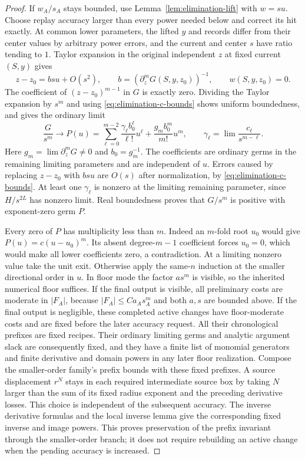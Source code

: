 \begin{proof}
If $w_A/s_A$ stays bounded, use Lemma~\ref{lem:elimination-lift}
with $w=su$.  Choose replay accuracy larger than every power needed
below and correct its hit exactly.  At common lower parameters, the
lifted $y$ and records differ from their center values by arbitrary
power errors, and the current and center $s$ have ratio tending to
$1$.  Taylor expansion in the original independent $z$ at fixed
current $(S,y)$ gives
\[
 z-z_0=b su+O(s^2),\qquad
 b=(\partial_z^mG(S,y,z_0))^{-1},\qquad w(S,y,z_0)=0.
\]
The coefficient of $(z-z_0)^{m-1}$ in $G$ is exactly zero.  Dividing
the Taylor expansion by $s^m$ and using
\eqref{eq:elimination-c-bounds} shows uniform boundedness, and gives
the ordinary limit
\begin{equation}\label{eq:elimination-polynomial}
 \frac{G}{s^m}\longrightarrow
 P(u)=\sum_{\ell=0}^{m-2}\frac{\gamma_\ell b_0^\ell}{\ell!}u^\ell
       +\frac{g_m b_0^m}{m!}u^m,
 \qquad
 \gamma_\ell=\lim\frac{c_\ell}{s^{m-\ell}}.
\end{equation}
Here $g_m=\lim\partial_z^mG\ne0$ and $b_0=g_m^{-1}$.
The coefficients are ordinary germs in the remaining limiting
parameters and are independent of $u$.  Errors caused by replacing
$z-z_0$ with $bsu$ are $O(s)$ after normalization, by
\eqref{eq:elimination-c-bounds}.  At least one $\gamma_\ell$ is
nonzero at the limiting remaining parameter, since $H/s^{2L}$ has
nonzero limit.  Real boundedness proves
that $G/s^m$ is positive with exponent-zero germ $P$.

Every zero of $P$ has multiplicity less than $m$.  Indeed an $m$-fold
root $u_0$ would give $P(u)=c(u-u_0)^m$.  Its absent degree-$m-1$
coefficient forces $u_0=0$, which would make all lower coefficients
zero, a contradiction.  At a limiting nonzero value take the unit
exit.  Otherwise apply the same-$n$ induction at the smaller
directional order in $u$.  In floor mode the factor $as^m$ is visible,
so the inherited numerical floor suffices.  If the final output is
visible, all preliminary costs are moderate in $|F_A|$, because
$|F_A|\le C a_As_A^m$ and both $a,s$ are bounded above.  If the
final output is negligible, these completed active changes have
floor-moderate costs and are fixed before the later accuracy request.
All their chronological prefixes are fixed recipes.  Their ordinary
limiting germs and analytic argument slack are consequently fixed,
and they have a finite list of monomial generators and finite
derivative and domain powers in any later floor realization.
Compose the smaller-order family's prefix bounds with these fixed
prefixes.  A source displacement $r^N$ stays in each required
intermediate source box by taking $N$ larger than the sum of its
fixed radius exponent and the preceding derivative losses.
This choice is independent of the subsequent accuracy.  The
inverse derivative formulas and the local inverse lemma give
the corresponding fixed inverse and image powers.  This proves
preservation of the prefix invariant through the smaller-order
branch; it does not require rebuilding an active change when
the pending accuracy is increased.


\end{proof}
